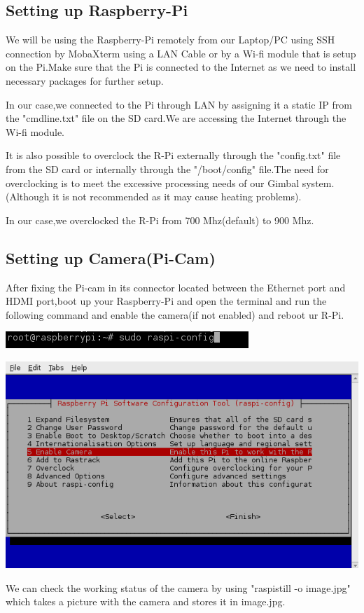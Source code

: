 \documentclass[11pt,a4paper]{article}
\begin{document}
		\subsection{Setting up Raspberry-Pi}
		\par We will be using the Raspberry-Pi remotely from our Laptop/PC using SSH connection by MobaXterm using a LAN Cable or by a Wi-fi module that is setup on the Pi.Make sure that the Pi is connected to the Internet as we need to install necessary packages for further setup.
		\par In our case,we connected to the Pi through LAN by assigning it a static IP from the "cmdline.txt" file on the SD card.We are accessing the Internet through the Wi-fi module.
		\par It is also possible to overclock the R-Pi externally through the "config.txt" file from the SD card or internally through the "/boot/config" file.The need for overclocking is to meet the excessive processing needs of our Gimbal system.(Although it is not recommended as it may cause heating problems).
		\par In our case,we overclocked the R-Pi from 700 Mhz(default) to 900 Mhz.
		
		\subsection{Setting up Camera(Pi-Cam)}
		After fixing the Pi-cam in its connector located between the Ethernet port and HDMI port,boot up your Raspberry-Pi and open the terminal and run the following command and enable the camera(if not enabled) and reboot ur R-Pi.
		\begin{center}
			\includegraphics[scale=0.6]{cmd.png}
		\end{center}
		\begin{center}
		   \includegraphics[scale=0.6]{enablecam.png}
		\end{center}
		\par We can check the working status of the camera by using "raspistill -o image.jpg" which takes a picture with the camera and stores it in image.jpg. 
	
\end{document}
